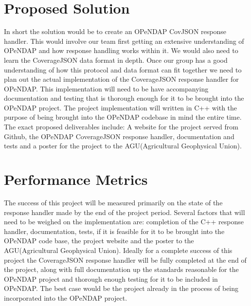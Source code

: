 \documentclass[letterpaper,10pt,draftclsnofoot,onecolumn]{IEEEtran}
\begin{document}
\section{Proposed Solution}
In short the solution would be to create an OPeNDAP CovJSON response handler. This would involve our team first getting an extensive understanding of OPeNDAP and how response handling works within it. We would also need to learn the CoverageJSON data format in depth. Once our group has a good understanding of how this protocol and data format can fit together we need to plan out the actual implementation of the CoverageJSON response handler for OPeNDAP. This implementation will need to be have accompanying documentation and testing that is thorough enough for it to be brought into the OPeNDAP project. The project implementation will written in C++ with the purpose of being brought into the OPeNDAP codebase in mind the entire time. The exact proposed deliverables include: A website for the project served from Github, the OPeNDAP CoverageJSON response handler, documentation and tests and a poster for the project to the AGU(Agricultural Geophysical Union).

\section{Performance Metrics}
The success of this project will be measured primarily on the state of the response handler made by the end of the project period. Several factors that will need to be weighed on the implementation are: completion of the C++ response handler, documentation, tests, if it is feasible for it to be brought into the OPeNDAP code base, the project website and the poster to the AGU(Agricultural Geophysical Union). Ideally for a complete success of this project the CoverageJSON response handler will be fully completed at the end of the project, along with full documentation up the standards reasonable for the OPeNDAP project and thorough enough testing for it to be included in OPeNDAP. The best case would be the project already in the process of being incorporated into the OPeNDAP project.
\end{document}
